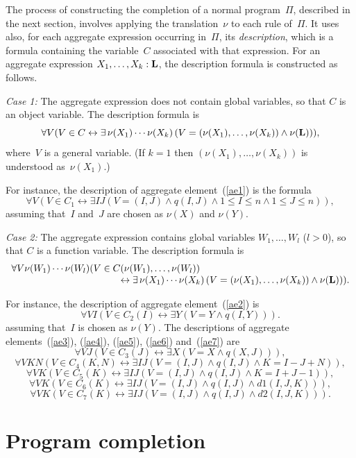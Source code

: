 \documentclass[11pt]{article}
\def\lrar{\leftrightarrow}
\def\beq{\begin{equation}}
\def\eeq#1{\label{#1}\end{equation}}
\def\ba{\begin{array}}
\def\ea{\end{array}}
\begin{document}
\begin{adjustwidth}{-1cm}{-1cm}
The process of constructing the completion of a normal program~$\Pi$,
described in the next section, involves applying the translation~$\nu$
to each rule of~$\Pi$.  It uses also, for each aggregate expression
occurring in~$\Pi$, its \emph{description}, which is a
formula containing the variable~$C$ associated with that expression.
For an aggregate expression $X_1,\dots,X_k :{\bf L}$, the description
formula is constructed as follows.

\medskip\noindent\emph{Case 1:} The aggregate expression does not contain
global variables, so that $C$ is an object variable.  The description
formula is
$$\forall V(V\in C\lrar\exists\, \nu(X_1)\cdots\nu(X_k)\,
(V=(\nu(X_1),\dots,\nu(X_k))
\land \nu({\bf L}))),$$
where~$V$ is a general variable.
(If $k=1$ then $(\nu(X_1),\dots,\nu(X_k))$ is understood as~$\nu(X_1)$.)

For instance, the description of aggregate element~(\ref{ae1}) is the formula
\beq
\forall V(V\in C_1 \lrar \exists IJ(V=(I,J)\land q(I,J) \land 1\leq I\leq n
\land 1\leq J\leq n)),
\eeq{d1}
assuming that~$I$ and~$J$ are chosen as $\nu(X)$ and $\nu(Y)$.

\medskip\noindent\emph{Case 2:} The aggregate expression contains
global variables $W_1,\dots,W_l$ ($l>0$), so that $C$ is a function
variable.  The description formula is
$$\ba l
\forall V \nu(W_1) \cdots \nu(W_l)(V\in C(\nu(W_1),\dots,\nu(W_l))\\
\hskip 4cm\lrar
\exists\, \nu(X_1)\cdots\nu(X_k)\,(V=(\nu(X_1),\dots,\nu(X_k))
\land \nu({\bf L}))).
\ea$$

For instance, the description of aggregate element~(\ref{ae2}) is
 \beq
 \forall V I(V\in C_2(I) \lrar \exists Y( V=Y \wedge q(I,Y))).
\eeq{d2}
assuming that~$I$ is chosen as $\nu(Y)$.  The descriptions of aggregate
elements~(\ref{ae3}), (\ref{ae4}), (\ref{ae5}), (\ref{ae6}) and~(\ref{ae7})
are
\beq
\forall V J(V\in C_3(J) \lrar \exists X( V=X \wedge q(X,J))),
\eeq{d3}
\beq
\forall VKN(V\in C_4(K,N) \lrar \exists IJ(V=(I,J) \land q(I,J)
   \land K=I-J+N)),
\eeq{d4}
\beq
\forall VK(V\in C_5(K) \lrar \exists IJ(V=(I,J) \land q(I,J)
   \land K=I+J-1)),
\eeq{d5}
\beq
\forall VK(V\in C_6(K) \lrar \exists IJ(V=(I,J) \land q(I,J) \land d1(I,J,K))),
\eeq{d6}
\beq
\forall VK(V\in C_7(K) \lrar \exists IJ(V=(I,J) \land q(I,J) \land d2(I,J,K))).
\eeq{d7}

\section{Program completion}


\end{adjustwidth}
\end{document}
